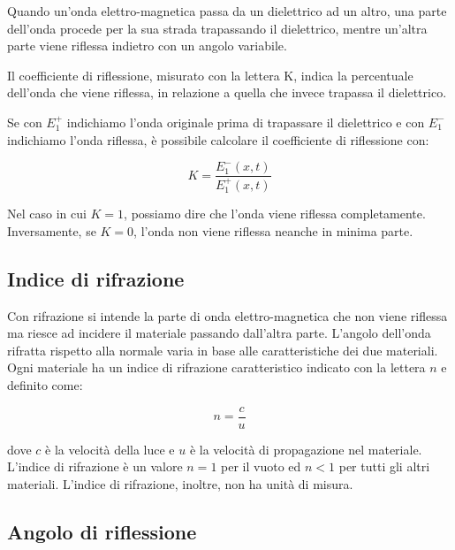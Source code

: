 \documentclass{article}
\begin{document}
    Quando un'onda elettro-magnetica passa da un dielettrico ad un altro, una parte dell'onda procede per la sua strada
    trapassando il dielettrico, mentre un'altra parte viene riflessa indietro con un angolo variabile.

    Il coefficiente di riflessione, misurato con la lettera K, indica la percentuale dell'onda che viene riflessa, in relazione
    a quella che invece trapassa il dielettrico.

    Se con $E^+_1$ indichiamo l'onda originale prima di trapassare il dielettrico e con $E^-_1$ indichiamo l'onda riflessa,
    è possibile calcolare il coefficiente di riflessione con:

    \begin{equation}
        K = \frac{E^-_1(x,t)}{E^+_1(x,t)}
    \end{equation}

    Nel caso in cui $K = 1$, possiamo dire che l'onda viene riflessa completamente. Inversamente, se $K = 0$, l'onda non viene
    riflessa neanche in minima parte.

    \subsection{Indice di rifrazione}

    Con rifrazione si intende la parte di onda elettro-magnetica che non viene riflessa ma riesce ad incidere il materiale
    passando dall'altra parte. L'angolo dell'onda rifratta rispetto alla normale varia in base alle caratteristiche dei due
    materiali. Ogni materiale ha un indice di rifrazione caratteristico indicato con la lettera $n$ e definito come:

    \begin{equation}
        n = \frac{c}{u}
    \end{equation}

    dove $c$ è la velocità della luce e $u$ è la velocità di propagazione nel materiale. L'indice di rifrazione è un valore $n = 1$
    per il vuoto ed $n < 1$ per tutti gli altri materiali. L'indice di rifrazione, inoltre, non ha unità di misura.

    \subsection{Angolo di riflessione}
\end{document}
